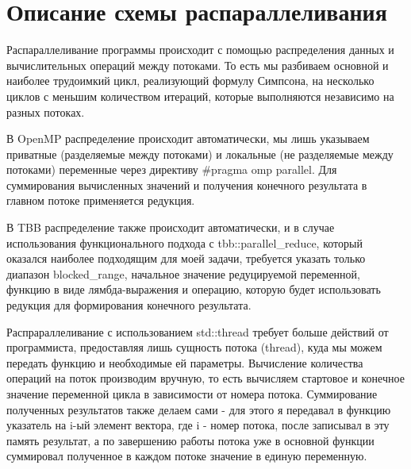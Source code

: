 \documentclass{report}
\begin{document}
\section*{Описание схемы распараллеливания}
\par Распараллеливание программы происходит с помощью распределения данных и вычислительных операций между потоками. То есть мы разбиваем основной и наиболее трудоимкий цикл, реализующий формулу Симпсона, на несколько циклов с меньшим количеством итераций, которые выполняются независимо на разных потоках.
\par В OpenMP распределение происходит автоматически, мы лишь указываем приватные (разделяемые между потоками) и локальные (не разделяемые между потоками) переменные через директиву \#pragma omp parallel. Для суммирования вычисленных значений и получения конечного результата в главном потоке применяется редукция.
\par В TBB распределение также происходит автоматически, и в случае использования функционального подхода с tbb::parallel\_reduce, который оказался наиболее подходящим для моей задачи, требуется указать только диапазон blocked\_range, начальное значение редуцируемой переменной, функцию в виде лямбда-выражения и операцию, которую будет использовать редукция для формирования конечного результата.
\par Распрараллеливание с использованием std::thread требует больше действий от программиста, предоставляя лишь сущность потока (thread), куда мы можем передать функцию и необходимые ей параметры. Вычисление количества операций на поток производим вручную, то есть вычисляем стартовое и конечное значение переменной цикла в зависимости от номера потока. Суммирование полученных результатов также делаем сами - для этого я передавал в функцию указатель на i-ый элемент вектора, где i - номер потока, после записывал в эту память результат, а по завершению работы потока уже в основной функции суммировал полученное в каждом потоке значение в единую переменную. 
\newpage

\end{document}
